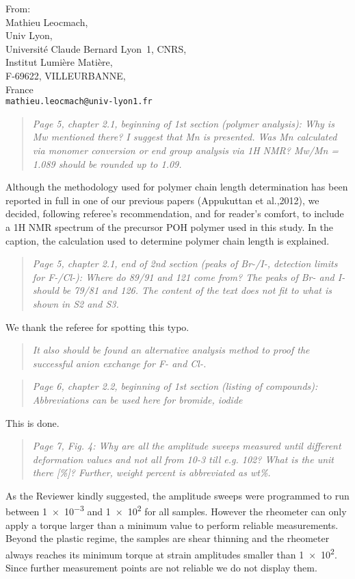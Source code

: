 \documentclass[a4paper, parskip=true, firsthead=false, fromemail=true, foldmarks=false]{scrlttr2}
\newenvironment{quotationi}
{\begin{quotation}\itshape}
{\end{quotation}}
\begin{document}
\begin{letter}{From:\\
Mathieu Leocmach,\\
Univ Lyon,\\ 
Universit\'e Claude Bernard Lyon~1, CNRS,\\
Institut Lumi\`ere Mati\`ere,\\
F-69622, VILLEURBANNE,\\
France\\
\texttt{mathieu.leocmach@univ-lyon1.fr}
}
\begin{quotationi}
Page 5, chapter 2.1, beginning of 1st section (polymer analysis): Why is Mw mentioned there? I suggest that Mn is presented. Was Mn calculated via monomer conversion or end group analysis via 1H NMR? Mw/Mn = 1.089 should be rounded up to 1.09.
\end{quotationi}

Although the methodology used for polymer chain length determination has been reported in full in one of our previous papers (Appukuttan et al.,2012), we decided, following referee's recommendation, and for reader's comfort, to include a 1H NMR spectrum of the precursor POH polymer used in this study. In the caption, the calculation used to determine polymer chain length is explained.

\begin{quotationi}
Page 5, chapter 2.1, end of 2nd section (peaks of Br-/I-, detection limits for F-/Cl-): Where do 89/91 and 121 come from? The peaks of Br- and I- should be 79/81 and 126. The content of the text does not fit to what is shown in S2 and S3.\end{quotationi}

We thank the referee for spotting this typo.

\begin{quotationi}
 It also should be found an alternative analysis method to proof the successful anion exchange for F- and Cl-.
\end{quotationi}

\begin{quotationi}
Page 6, chapter 2.2, beginning of 1st section (listing of compounds): Abbreviations can be used here for bromide, iodide 
\end{quotationi}

This is done.

\begin{quotationi}
Page 7, Fig. 4: Why are all the amplitude sweeps measured until different deformation values and not all from 10-3 till e.g. 102? What is the unit there [\%]? Further, weight percent is abbreviated as wt\%.
\end{quotationi}

As the Reviewer kindly suggested, the amplitude sweeps were programmed to run between \num{1e-3} and \num{1e2} for all samples. However the rheometer can only apply a torque larger than a minimum value to perform reliable measurements. Beyond the plastic regime, the samples are shear thinning and the rheometer always reaches its minimum torque at strain amplitudes smaller than \num{1e2}. Since further measurement points are not reliable we do not display them.


\end{letter}
\end{document}
